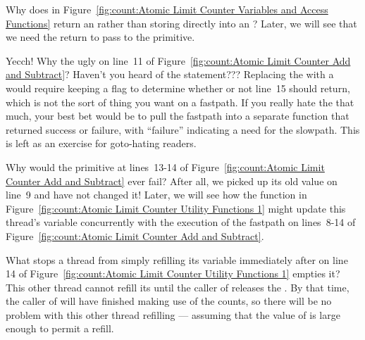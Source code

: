 \QuickQ{}
	Why does  in
	Figure~\ref{fig:count:Atomic Limit Counter Variables and Access Functions}
	return an  rather than storing directly into an
	?
\QuickA{}
	Later, we will see that we need the  return to pass
	to the  primitive.

\QuickQ{}
	Yecch!
	Why the ugly  on line~11 of
	Figure~\ref{fig:count:Atomic Limit Counter Add and Subtract}?
	Haven't you heard of the  statement???
\QuickA{}
	Replacing the  with a  would require keeping
	a flag to determine whether or not line~15 should return, which
	is not the sort of thing you want on a fastpath.
	If you really hate the  that much, your best bet would
	be to pull the fastpath into a separate function that returned
	success or failure, with ``failure'' indicating a need for the
	slowpath.
	This is left as an exercise for goto-hating readers.

\QuickQ{}
	Why would the  primitive at lines~13-14 of
	Figure~\ref{fig:count:Atomic Limit Counter Add and Subtract}
	ever fail?
	After all, we picked up its old value on line~9 and have not
	changed it!
\QuickA{}
	Later, we will see how the  function in
	Figure~\ref{fig:count:Atomic Limit Counter Utility Functions 1}
	might update this thread's  variable concurrently
	with the execution of the fastpath on lines~8-14 of
	Figure~\ref{fig:count:Atomic Limit Counter Add and Subtract}.

\QuickQ{}
	What stops a thread from simply refilling its
	 variable immediately after
	 on line 14 of
	Figure~\ref{fig:count:Atomic Limit Counter Utility Functions 1}
	empties it?
\QuickA{}
	This other thread cannot refill its 
	until the caller of  releases the
	.
	By that time, the caller of  will have
	finished making use of the counts, so there will be no problem
	with this other thread refilling --- assuming that the value
	of  is large enough to permit a refill.

